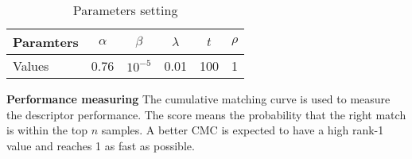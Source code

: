 \begin{table}[H]
\centering
\caption{Parameters setting}
\label{ParametersSetting}
\begin{tabular}{|l|c|c|c|c|c|}
\hline
Paramters &$\alpha$&$\beta$&$\lambda$&$t$& $\rho$\\
\hline
Values &0.76&$10^{-5}$&0.01&100&1\\
\hline
\end{tabular}
\end{table}


\textbf{Performance measuring} The cumulative matching curve is used to measure the descriptor performance. The score means the probability that the right match is within the top $n$ samples. A better CMC is expected to have a high rank-1 value and reaches 1 as fast as possible.


